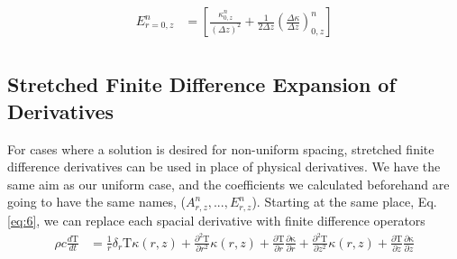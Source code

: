 \documentclass[12pt]{article}
\begin{document}
		\begin{equation}
      \begin{aligned}
        E^n_{r=0, z} &= \left [ \frac{\kappa^n_{0, z}}{(\Delta z)^2} + \frac{1}{2\Delta z}(\frac{\Delta\kappa}{\Delta z})^n_{0, z} \right ] \\
      \end{aligned}
		\end{equation}

	\subsection{Stretched Finite Difference Expansion of Derivatives}
    For cases where a solution is desired for non-uniform spacing, stretched finite difference derivatives can be used in place of physical derivatives. We have the same aim as our uniform case, and the coefficients we calculated beforehand are going to have the same names, ($A^n_{r, z}, ... , E^n_{r, z}$). Starting at the same place, Eq. \ref{eq:6}, we can replace each spacial derivative with finite difference operators
  \begin{equation}
    \begin{aligned}
      \rho c \frac{d\mathrm{T}}{dt} &= \frac{1}{r} \delta_r\mathrm{T}\kappa(r, z) + \frac{\partial^2\mathrm{T}}{\partial r^2}\kappa(r, z)  + \frac{\partial\mathrm{T}}{\partial r} \frac{\partial\mathrm{\kappa}}{\partial r}  + \frac{\partial^2\mathrm{T}}{\partial z^2}\kappa(r, z) + \frac{\partial\mathrm{T}}{\partial z}\frac{\partial\mathrm{\kappa}}{\partial z} \\
    \end{aligned}
  \end{equation} 
    
\end{document}
